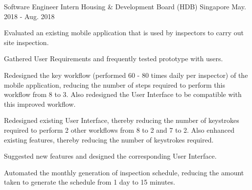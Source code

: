 

\begin{cventries}

  \cventry
    {Software Engineer Intern} %
    {Housing \& Development Board (HDB)} %
    {Singapore} %
    {May. 2018 - Aug. 2018} %
    {
      \begin{cvitems} %
        \item {Evaluated an existing mobile application that is used by inspectors to carry out site inspection.}
        \item {Gathered User Requirements and frequently tested prototype with users.}
        \item {Redesigned the key workflow (performed 60 - 80 times daily per inspector) of the mobile application, reducing the number of steps required to perform this workflow from 8 to 3. Also redesigned the User Interface to be compatible with this improved workflow.}
        \item {Redesigned existing User Interface, thereby reducing the number of keystrokes required to perform 2 other workflows from 8 to 2 and 7 to 2. Also enhanced existing features, thereby reducing the number of keystrokes required.}
        \item {Suggested new features and designed the corresponding User Interface.}
        \item {Automated the monthly generation of inspection schedule, reducing the amount taken to generate the schedule from 1 day to 15 minutes.}
      \end{cvitems}
    }


\end{cventries}

